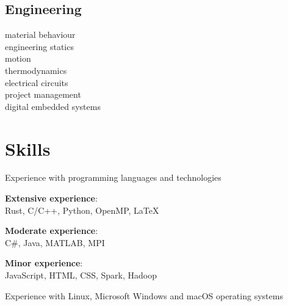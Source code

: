 \documentclass[a4paper]{style}
\begin{document}
\begin{minipage}[t]{0.45\textwidth}
\subsection{Engineering}
material behaviour \\
engineering statics \\
motion \\
thermodynamics \\
electrical circuits \\
project management \\
digital embedded systems

\sectionspace{}

\section{Skills}
\vspace{5pt}
\begin{tightitemize}
    \item Experience with programming languages and technologies\\
    \begin{tightitemize}
		\item \textbf{Extensive experience}: \\Rust, C/C++, Python, OpenMP, \LaTeX{}
        \item \textbf{Moderate experience}: \\C\#, Java, MATLAB, MPI
        \item \textbf{Minor experience}: \\JavaScript, HTML, CSS, Spark, Hadoop
    \end{tightitemize}
    \item Experience with Linux, Microsoft Windows and macOS operating systems
\end{tightitemize}

\end{minipage} %
\hfill
%
%
\end{document}
